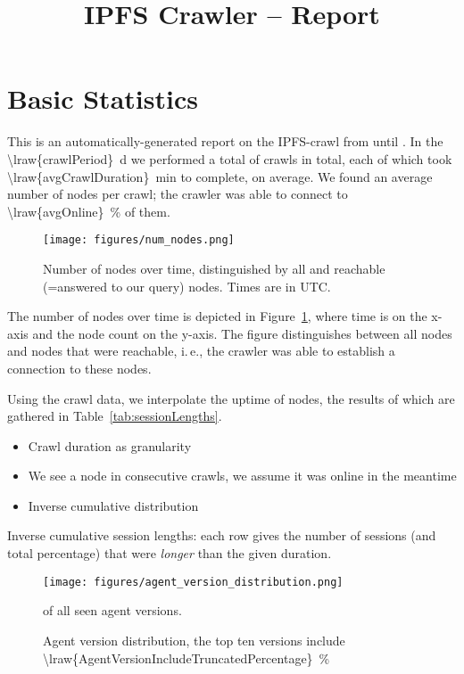 \documentclass[10pt]{article}
\title{IPFS Crawler -- Report}
\makeatletter
\newcommand*{\ie}{i.\,e.\@\xspace}
\makeatother
\begin{document}
\maketitle


\section{Basic Statistics}
\label{sec:basic}

This is an automatically-generated report on the IPFS-crawl from until .
In the \SI{\lraw{crawlPeriod}}{\day} we performed a total of  crawls in total, each of which took \SI{\lraw{avgCrawlDuration}}{\minute} to complete, on average.
We found an average number of  nodes per crawl; the crawler was able to connect to \SI{\lraw{avgOnline}}{\percent} of them.
%
\begin{figure}
\centering
  \texttt{[image: figures/num\_nodes.png]}
  \caption{Number of nodes over time, distinguished by all and reachable (=answered to our query) nodes. Times are in UTC.}
  \label{fig:num_nodes}
\end{figure}
%
The number of nodes over time is depicted in Figure~\ref{fig:num_nodes}, where time is on the x-axis and the node count on the y-axis.
The figure distinguishes between all nodes and nodes that were reachable, \ie, the crawler was able to establish a connection to these nodes.

Using the crawl data, we interpolate the uptime of nodes, the results of which are gathered in Table~\ref{tab:sessionLengths}.
\begin{itemize}
  \item Crawl duration as granularity
  \item We see a node in consecutive crawls, we assume it was online in the meantime
  \item Inverse cumulative distribution
\end{itemize}
%
\begin{table}
  \center
  
  \caption{Inverse cumulative session lengths: each row gives the number of sessions (and total percentage) that were \emph{longer} than the given duration.}
  \label{tab:sessionLengths}
\end{table}
%
\begin{figure}
  \centering
  \texttt{[image: figures/agent\_version\_distribution.png]}
  \caption{Agent version distribution, the top ten versions include \SI{\lraw{AgentVersionIncludeTruncatedPercentage}}{\percent}} of all seen agent versions.
  \label{figs:agent_version_distribution}
\end{figure}
\end{document}
